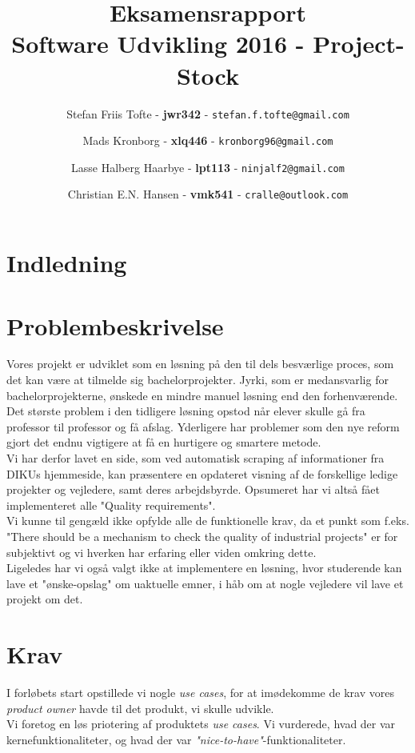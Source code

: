 \documentclass[12pt]{article}
\title{
  \vspace{3cm}
  \Huge{Eksamensrapport} \\
  \Large{Software Udvikling 2016 - Project-Stock}
	}
\author{
	\Large{Stefan Friis Tofte} - \textbf{jwr342} - \texttt{stefan.f.tofte@gmail.com}
	\and
	\Large{Mads Kronborg} - \textbf{xlq446} - \texttt{kronborg96@gmail.com}
	\and
	\Large{Lasse Halberg Haarbye} - \textbf{lpt113} - \texttt{ninjalf2@gmail.com}
	\and
	\Large{Christian E.N. Hansen} - \textbf{vmk541} - \texttt{cralle@outlook.com}
}
\def \ColourPDF {../include/ku-farve}
\def \TitlePDF {../include/ku-en}  %
\begin{document}


\clearpage\maketitle
\thispagestyle{empty}

\newpage
\tableofcontents
\newpage

\section{Indledning}
\label{sec:indledning}

\section{Problembeskrivelse}
\label{sec:problem}
Vores projekt er udviklet som en løsning på den til dels besværlige proces, som det kan være at tilmelde sig bachelorprojekter. Jyrki, som er medansvarlig for bachelorprojekterne, ønskede en mindre manuel løsning end den forhenværende. Det største problem i den tidligere løsning opstod når elever skulle gå fra professor til professor og få afslag. Yderligere har problemer som den nye reform gjort det endnu vigtigere at få en hurtigere og smartere metode. \\
Vi har derfor lavet en side, som ved automatisk scraping af informationer fra DIKUs hjemmeside, kan præsentere en opdateret visning af de forskellige ledige projekter og vejledere, samt deres arbejdsbyrde. Opsumeret har vi altså fået implementeret alle "Quality requirements". \\
Vi kunne til gengæld ikke opfylde alle de funktionelle krav, da et punkt som f.eks. "There should be a mechanism to check the quality of industrial projects"{} er for subjektivt og vi hverken har erfaring eller viden omkring dette. \\
Ligeledes har vi også valgt ikke at implementere en løsning, hvor studerende kan lave et "ønske-opslag"{} om uaktuelle emner, i håb om at nogle vejledere vil lave et projekt om det.


\section{Krav}
\label{sec:krav}
I forløbets start opstillede vi nogle \textit{use cases}, for at imødekomme de krav vores \textit{product owner} havde til det produkt, vi skulle udvikle. \\
Vi foretog en løs priotering af produktets \textit{use cases}. Vi vurderede, hvad der var kernefunktionaliteter, og hvad der var \textit{"nice-to-have"}-funktionaliteter.
\end{document}
